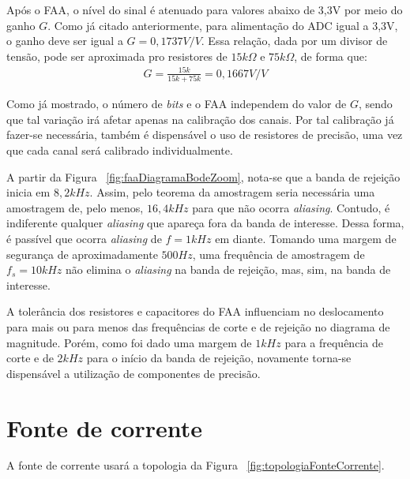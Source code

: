 \documentclass[11pt]{abntex2}
\begin{document}
				Após o FAA, o nível do sinal é atenuado para valores abaixo de
				3,3V por meio do ganho $G$. Como já citado anteriormente, para
				alimentação do ADC igual  a 3,3V, o ganho deve ser igual a $G =
				0,1737V/V$. Essa relação, dada por um divisor de tensão, pode
				ser aproximada pro resistores de $15k\Omega$ e $75k\Omega$, de
				forma que:
				\begin{gather*}
					G = \frac{15k}{15k+75k} = 0,1667V/V
				\end{gather*}

				Como já mostrado, o número de \textit{bits} e o FAA independem do valor
				de $G$, sendo que tal variação irá afetar apenas na calibração dos
				canais. Por tal calibração já fazer-se necessária, também é
				dispensável o uso de resistores de precisão, uma vez que cada
				canal será calibrado individualmente.

				A partir da Figura ~\ref{fig:faaDiagramaBodeZoom}, nota-se que a banda de rejeição inicia em
				$8,2kHz$. Assim, pelo teorema da amostragem seria necessária uma amostragem
				de, pelo menos, $16,4kHz$ para que não ocorra \textit{aliasing}. Contudo,
				é indiferente qualquer \textit{aliasing} que apareça fora da banda de interesse.
				Dessa forma, é passível que ocorra \textit{aliasing} de $f=1kHz$ em diante. Tomando
				uma margem de segurança de aproximadamente $500Hz$, uma frequência de amostragem
				de $f_s=10kHz$ não elimina o \textit{aliasing} na banda de rejeição, mas, sim, na banda
				de interesse.

				A tolerância dos resistores e capacitores do FAA influenciam no
				deslocamento para mais ou para menos das frequências de corte e
				de rejeição no diagrama de magnitude. Porém, como foi dado uma
				margem de $1kHz$ para a frequência de corte e de $2kHz$ para o
				início da banda de rejeição, novamente torna-se dispensável a
				utilização de componentes de precisão.
				\newpage

			\section{Fonte de corrente}

				A fonte de corrente usará a topologia da Figura ~\ref{fig:topologiaFonteCorrente}.
\end{document}

